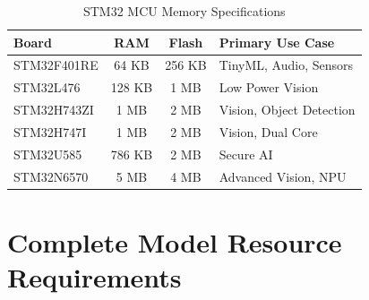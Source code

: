 \begin{table}[H]
    \centering
    \caption{STM32 MCU Memory Specifications}
    \begin{tabular}{|l|c|c|l|}
        \hline
        \textbf{Board} & \textbf{RAM} & \textbf{Flash} & \textbf{Primary Use Case} \\
        \hline
        STM32F401RE    & 64 KB        & 256 KB         & TinyML, Audio, Sensors    \\
        STM32L476      & 128 KB       & 1 MB           & Low Power Vision          \\
        STM32H743ZI    & 1 MB         & 2 MB           & Vision, Object Detection  \\
        STM32H747I     & 1 MB         & 2 MB           & Vision, Dual Core         \\
        STM32U585      & 786 KB       & 2 MB           & Secure AI                 \\
        STM32N6570     & 5 MB         & 4 MB           & Advanced Vision, NPU      \\
        \hline
    \end{tabular}
\end{table}

\section{Complete Model Resource Requirements}

